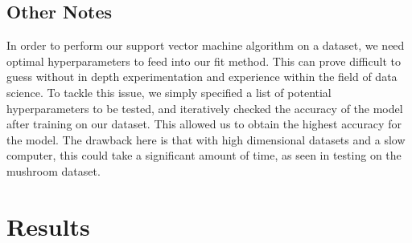 \documentclass[12pt]{article}%
\begin{document}
	\subsection{Other Notes}
	In order to perform our support vector machine algorithm on a dataset, we need optimal hyperparameters to feed into our fit method.  This can prove difficult to guess without in depth experimentation and experience within the field of data science.  To tackle this issue, we simply specified a list of potential hyperparameters to be tested, and iteratively checked the accuracy of the model after training on our dataset.  This allowed us to obtain the highest accuracy for the model.  The drawback here is that with high dimensional datasets and a slow computer, this could take a significant amount of time, as seen in testing on the mushroom dataset.
	
	\section{Results}
\end{document}
